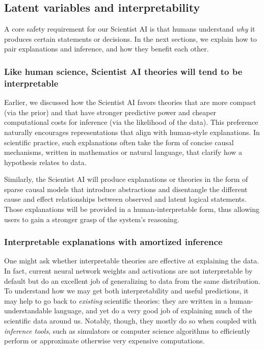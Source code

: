 \subsection{Latent variables and interpretability}
\label{sec:plan:latentvar}
    
A core safety requirement for our Scientist AI is that humans understand \emph{why} it produces certain statements or decisions. In the next sections, we explain how to pair explanations and inference, and how they benefit each other. 


    \subsubsection{Like human science, Scientist AI theories will tend to be interpretable}
    
Earlier, we discussed how the Scientist AI favors theories that are more compact (via the prior) and that have stronger predictive power and cheaper computational costs for inference (via the likelihood of the data). This preference naturally encourages representations that align with human-style explanations. In scientific practice, such explanations often take the form of concise causal mechanisms, written in mathematics or natural language, that clarify how a hypothesis relates to data.

Similarly, the Scientist AI will produce explanations or theories in the form of sparse causal models that introduce abstractions and disentangle the different cause and effect relationships between observed and latent logical statements. Those explanations will be provided in a human-interpretable form, thus allowing users to gain a stronger grasp of the system’s reasoning.

    \subsubsection{Interpretable explanations with amortized inference}
    
One might ask whether interpretable theories are effective at explaining the data. In fact, current neural network weights and activations are not interpretable by default \cite{arxiv.org.abs.2407.02646,transformer.circuits.pub.2023.monosemantic.features} but do an excellent job of generalizing to data from the same distribution. To understand how we may get both interpretability and useful predictions, it may help to go back to \emph{existing} scientific theories: they are written in a human-understandable language, and yet do a very good job of explaining much of the scientific data around us. Notably, though, they mostly do so when coupled with \emph{inference tools}, such as simulators or computer science algorithms to efficiently perform or approximate otherwise very expensive computations.


